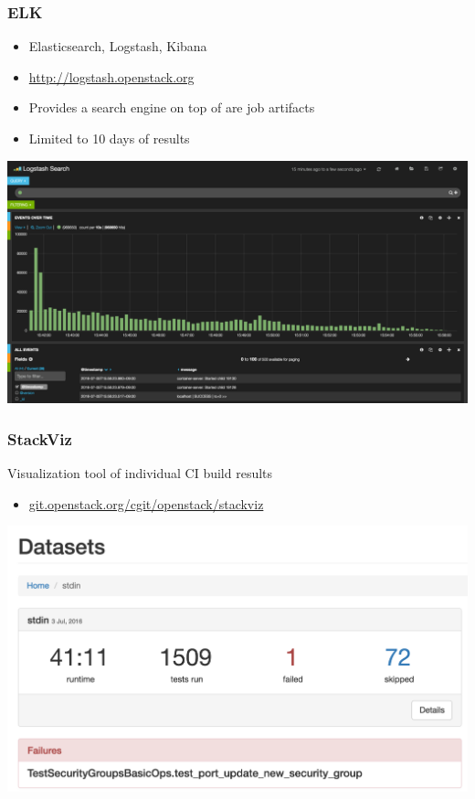 \documentclass[aspectratio=169,11pt,hyperref={colorlinks=true}]{beamer}
\begin{document}
\begin{frame}
  \frametitle{ELK}
  \begin{itemize}
    \item Elasticsearch, Logstash, Kibana
    \item \href{http://logstash.openstack.org}{http://logstash.openstack.org}
    \item Provides a search engine on top of are job artifacts
    \item Limited to 10 days of results
  \end{itemize}
  \begin{center}
    \includegraphics[width=.75\textwidth]{kibana-sample.png}
  \end{center}
\end{frame}

\begin{frame}
  \frametitle{StackViz}
  Visualization tool of individual CI build results
  \begin{itemize}
    \item \href{http://git.openstack.org/cgit/openstack/stackviz}{git.openstack.org/cgit/openstack/stackviz}
  \end{itemize}
  \begin{center}
    \includegraphics[width=1.0\textheight]{stackviz-sample-top.png}
  \end{center}
\end{frame}
\end{document}
